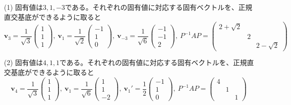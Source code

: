 \noindent (1) 固有値は$3, 1, -3$である。それぞれの固有値に対応する固有ベクトルを、正規直交基底ができるように取ると
\[
\bm{v}_{3} =
\frac{1}{\sqrt{3}}
\begin{pmatrix}
1 \\
1 \\
1
\end{pmatrix}, \ 
\bm{v}_{1} =
\frac{1}{\sqrt{2}}
\begin{pmatrix}
-1 \\
1 \\
0
\end{pmatrix}, \ 
\bm{v}_{-3} =
\frac{1}{\sqrt{6}}
\begin{pmatrix}
-1 \\
-1 \\
2
\end{pmatrix}, \ 
P^{-1} A P 
= 
\begin{pmatrix}
2 + \sqrt{2} \\
& 2 \\
& & 2 - \sqrt{2}
\end{pmatrix}
\]

\noindent (2) 固有値は$4, 1, 1$である。それぞれの固有値に対応する固有ベクトルを、正規直交基底ができるように取ると %
\[
\bm{v}_{4} =
\frac{1}{\sqrt{3}}
\begin{pmatrix}
1 \\
1 \\
1
\end{pmatrix}, \ 
\bm{v}_{1} =
\frac{1}{\sqrt{6}}
\begin{pmatrix}
1 \\
1 \\
-2
\end{pmatrix}, \ 
\bm{v}_{1}' =
\frac{1}{2}
\begin{pmatrix}
-1 \\
1 \\
0
\end{pmatrix}, \ 
P^{-1} A P 
= 
\begin{pmatrix}
4 \\
& 1 \\
& & 1
\end{pmatrix}
\]

